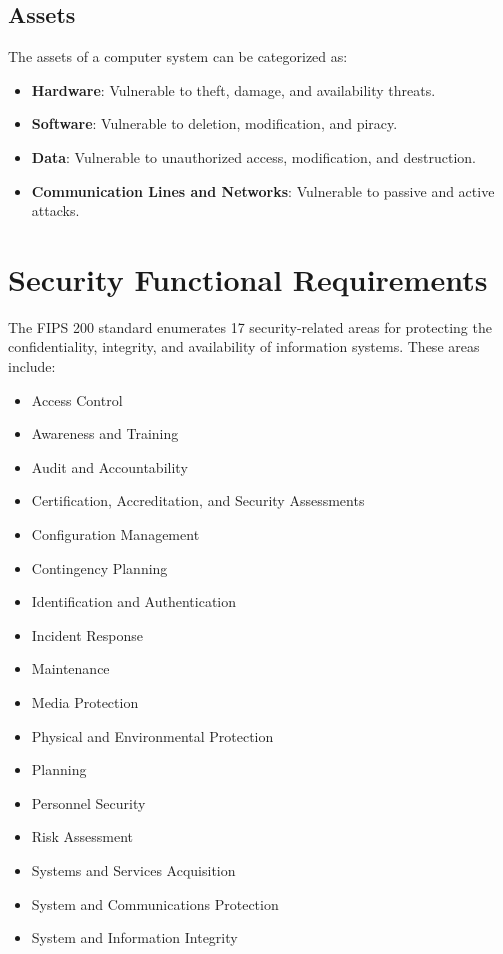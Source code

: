 \documentclass{article}
\begin{document}
\subsection{Assets}
The assets of a computer system can be categorized as:
\begin{itemize}
    \item \textbf{Hardware}: Vulnerable to theft, damage, and availability threats.
    \item \textbf{Software}: Vulnerable to deletion, modification, and piracy.
    \item \textbf{Data}: Vulnerable to unauthorized access, modification, and destruction.
    \item \textbf{Communication Lines and Networks}: Vulnerable to passive and active attacks.
\end{itemize}

\section{Security Functional Requirements}
The FIPS 200 standard enumerates 17 security-related areas for protecting the confidentiality, integrity, and availability of information systems. These areas include:
\begin{itemize}
    \item Access Control
    \item Awareness and Training
    \item Audit and Accountability
    \item Certification, Accreditation, and Security Assessments
    \item Configuration Management
    \item Contingency Planning
    \item Identification and Authentication
    \item Incident Response
    \item Maintenance
    \item Media Protection
    \item Physical and Environmental Protection
    \item Planning
    \item Personnel Security
    \item Risk Assessment
    \item Systems and Services Acquisition
    \item System and Communications Protection
    \item System and Information Integrity
\end{itemize}
\end{document}
